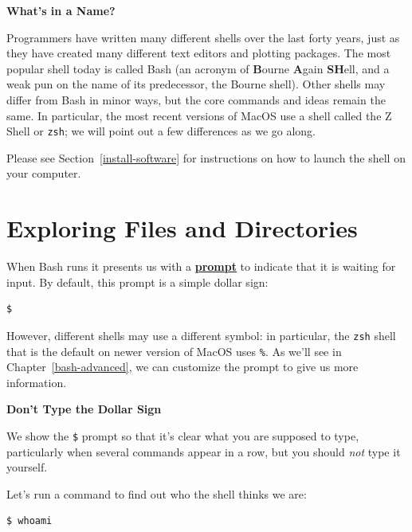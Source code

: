 \documentclass[
]{krantz}
\renewenvironment{quote}{\begin{VF}}{\end{VF}}
\newcommand{\gref}[2]{\hyperlink{#2}{\textbf{#1}}}
\begin{document}
\begin{quote}
\textbf{What's in a Name?}

Programmers have written many different shells over the last forty years,
just as they have created many different text editors and plotting packages.
The most popular shell today is called Bash
(an acronym of \textbf{B}ourne \textbf{A}gain \textbf{SH}ell,
and a weak pun on the name of its predecessor,
the Bourne shell).
Other shells may differ from Bash in minor ways,
but the core commands and ideas remain the same.
In particular,
the most recent versions of MacOS use a shell called the Z Shell or \texttt{zsh};
we will point out a few differences as we go along.
\end{quote}

Please see Section~\ref{install-software} for instructions
on how to launch the shell on your computer.

\hypertarget{bash-basics-explore}{%
\section{Exploring Files and Directories}\label{bash-basics-explore}}

When Bash runs it presents us with a \gref{prompt}{prompt} to indicate that it is waiting for input.
By default,
this prompt is a simple dollar sign:

\begin{verbatim}
$
\end{verbatim}

However,
different shells may use a different symbol:
in particular,
the \texttt{zsh} shell that is the default on newer version of MacOS uses \texttt{\%}.
As we'll see in Chapter~\ref{bash-advanced},
we can customize the prompt to give us more information.

\begin{quote}
\textbf{Don't Type the Dollar Sign}

We show the \texttt{\$} prompt so that it's clear what you are supposed to type,
particularly when several commands appear in a row,
but you should \emph{not} type it yourself.
\end{quote}

Let's run a command to find out who the shell thinks we are:

\begin{verbatim}
$ whoami
\end{verbatim}
\end{document}
